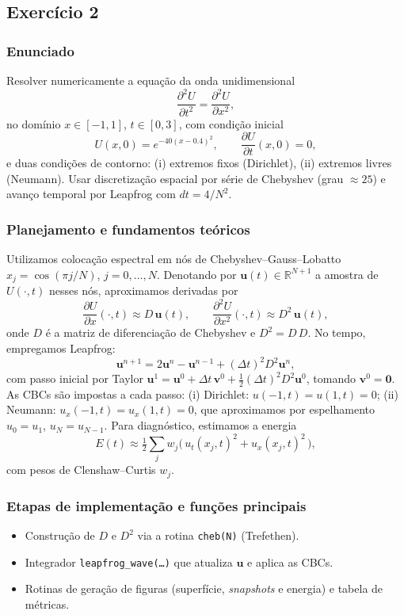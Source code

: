 \documentclass[12pt,a4paper]{article}
\begin{document}
\subsection{Exercício 2}

\subsubsection{Enunciado}
Resolver numericamente a equação da onda unidimensional
\[
\frac{\partial^2 U}{\partial t^2} = \frac{\partial^2 U}{\partial x^2},
\]
no domínio \(x\in[-1,1]\), \(t\in[0,3]\), com condição inicial
\[
U(x,0) = e^{-40(x-0.4)^2}, \qquad \frac{\partial U}{\partial t}(x,0)=0,
\]
e duas condições de contorno: (i) extremos fixos (Dirichlet), (ii) extremos livres (Neumann).
Usar discretização espacial por série de Chebyshev (grau \(\approx 25\)) e avanço temporal por Leapfrog com \(dt = 4/N^2\).

\subsubsection{Planejamento e fundamentos teóricos}
Utilizamos colocação espectral em nós de Chebyshev--Gauss--Lobatto \(x_j=\cos(\pi j/N)\), \(j=0,\ldots,N\).
Denotando por \(\mathbf u(t)\in\mathbb{R}^{N+1}\) a amostra de \(U(\cdot,t)\) nesses nós, aproximamos derivadas por
\[
\frac{\partial U}{\partial x}(\cdot,t)\approx D\,\mathbf u(t),\qquad
\frac{\partial^2 U}{\partial x^2}(\cdot,t)\approx D^2\,\mathbf u(t),
\]
onde \(D\) é a matriz de diferenciação de Chebyshev e \(D^2=D\,D\).
No tempo, empregamos Leapfrog:
\[
\mathbf u^{n+1} = 2\mathbf u^{n}-\mathbf u^{n-1} + (\Delta t)^2 D^2 \mathbf u^{n},
\]
com passo inicial por Taylor
\(\mathbf u^{1}=\mathbf u^{0}+\Delta t\,\mathbf v^{0}+\tfrac12(\Delta t)^2 D^2\mathbf u^{0}\), tomando \(\mathbf v^{0}=\mathbf 0\).
As CBCs são impostas a cada passo:
(i) Dirichlet: \(u(-1,t)=u(1,t)=0\);
(ii) Neumann: \(u_x(-1,t)=u_x(1,t)=0\), que aproximamos por espelhamento \(u_0\!=\!u_1\), \(u_N\!=\!u_{N-1}\).
Para diagnóstico, estimamos a energia
\[
E(t)\approx \tfrac12\sum_j w_j\bigl(\,u_t(x_j,t)^2 + u_x(x_j,t)^2\,\bigr),
\]
com pesos de Clenshaw--Curtis \(w_j\).

\subsubsection{Etapas de implementação e funções principais}
\begin{itemize}
  \item Construção de \(D\) e \(D^2\) via a rotina \texttt{cheb(N)} (Trefethen).
  \item Integrador \texttt{leapfrog\_wave(\dots)} que atualiza \(\mathbf u\) e aplica as CBCs.
  \item Rotinas de geração de figuras (superfície, \emph{snapshots} e energia) e tabela de métricas.
\end{itemize}
\end{document}
